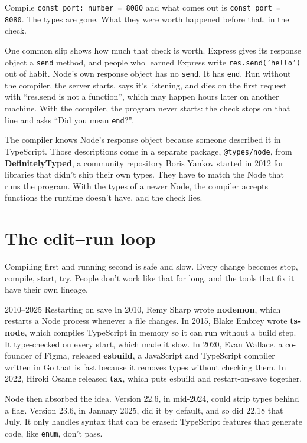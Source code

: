 Compile \texttt{const port:\ number = 8080} and what comes out is
\texttt{const port = 8080}. The types are gone. What they were worth happened
before that, in the check.

One common slip shows how much that check is worth. Express gives its response
object a \texttt{send} method, and people who learned Express write
\texttt{res.send('hello')} out of habit. Node's own response object has no
\texttt{send}. It has \texttt{end}. Run without the compiler, the server starts,
says it's listening, and dies on the first request with ``res.send is not a
function'', which may happen hours later on another machine. With the compiler,
the program never starts: the check stops on that line and asks ``Did you mean
\texttt{end}?''.

The compiler knows Node's response object because someone described it in
TypeScript. Those descriptions come in a separate package, \texttt{@types/node},
from \textbf{DefinitelyTyped}, a community repository Boris Yankov started in
2012 for libraries that didn't ship their own types. They have to match the
Node that runs the program. With the types of a newer Node, the compiler
accepts functions the runtime doesn't have, and the check lies.

\section{The edit--run loop}

Compiling first and running second is safe and slow. Every change becomes
stop, compile, start, try. People don't work like that for long, and the tools
that fix it have their own lineage.

\begin{history}{2010--2025 \textperiodcentered{} Restarting on save}
In 2010, Remy Sharp wrote \textbf{nodemon}, which restarts a Node process
whenever a file changes. In 2015, Blake Embrey wrote \textbf{ts-node}, which
compiles TypeScript in memory so it can run without a build step. It
type-checked on every start, which made it slow. In 2020, Evan Wallace, a
co-founder of Figma, released \textbf{esbuild}, a JavaScript and TypeScript
compiler written in Go that is fast because it removes types without checking
them. In 2022, Hiroki Osame released \textbf{tsx}, which puts esbuild and
restart-on-save together.

Node then absorbed the idea. Version 22.6, in mid-2024, could strip types
behind a flag. Version 23.6, in January 2025, did it by default, and so did
22.18 that July. It only handles syntax that can be erased: TypeScript features
that generate code, like \texttt{enum}, don't pass.
\end{history}

